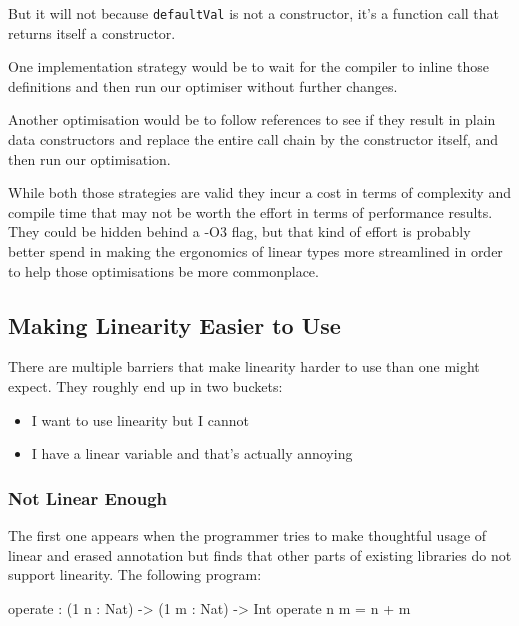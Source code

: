 \documentclass[
]{article}
\newenvironment{Shaded}{}{}
\newcommand{\DataTypeTok}[1]{\textcolor[rgb]{0.56,0.13,0.00}{#1}}
\newcommand{\DecValTok}[1]{\textcolor[rgb]{0.25,0.63,0.44}{#1}}
\newcommand{\NormalTok}[1]{#1}
\newcommand{\OperatorTok}[1]{\textcolor[rgb]{0.40,0.40,0.40}{#1}}
\newcommand{\OtherTok}[1]{\textcolor[rgb]{0.00,0.44,0.13}{#1}}
\providecommand{\tightlist}{%
  \setlength{\itemsep}{0pt}\setlength{\parskip}{0pt}}
\begin{document}
But it will not because \texttt{defaultVal} is not a constructor, it's a
function call that returns itself a constructor.

One implementation strategy would be to wait for the compiler to inline
those definitions and then run our optimiser without further changes.

Another optimisation would be to follow references to see if they result
in plain data constructors and replace the entire call chain by the
constructor itself, and then run our optimisation.

While both those strategies are valid they incur a cost in terms of
complexity and compile time that may not be worth the effort in terms of
performance results. They could be hidden behind a -O3 flag, but that
kind of effort is probably better spend in making the ergonomics of
linear types more streamlined in order to help those optimisations be
more commonplace.

\hypertarget{making-linearity-easier-to-use}{%
\subsection{Making Linearity Easier to
Use}\label{making-linearity-easier-to-use}}

There are multiple barriers that make linearity harder to use than one
might expect. They roughly end up in two buckets:

\begin{itemize}
\tightlist
\item
  I want to use linearity but I cannot
\item
  I have a linear variable and that's actually annoying
\end{itemize}

\hypertarget{not-linear-enough}{%
\subsubsection{Not Linear Enough}\label{not-linear-enough}}

The first one appears when the programmer tries to make thoughtful usage
of linear and erased annotation but finds that other parts of existing
libraries do not support linearity. The following program:

\begin{Shaded}
\begin{Highlighting}[]
\NormalTok{operate }\OperatorTok{:}\NormalTok{ (}\DecValTok{1}\NormalTok{ n }\OperatorTok{:} \DataTypeTok{Nat}\NormalTok{) }\OtherTok{{-}\textgreater{}}\NormalTok{ (}\DecValTok{1}\NormalTok{ m }\OperatorTok{:} \DataTypeTok{Nat}\NormalTok{) }\OtherTok{{-}\textgreater{}} \DataTypeTok{Int}
\NormalTok{operate n m }\OtherTok{=}\NormalTok{ n }\OperatorTok{+}\NormalTok{ m}
\end{Highlighting}
\end{Shaded}
\end{document}
